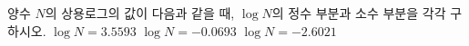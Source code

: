 양수 $N$의 상용로그의 값이 다음과 같을 때, $\log N$의 정수 부분과 소수 부분을 각각 구하시오.
 $\log N=3.5593$
 $\log N=-0.0693$
 $\log N=-2.6021$
